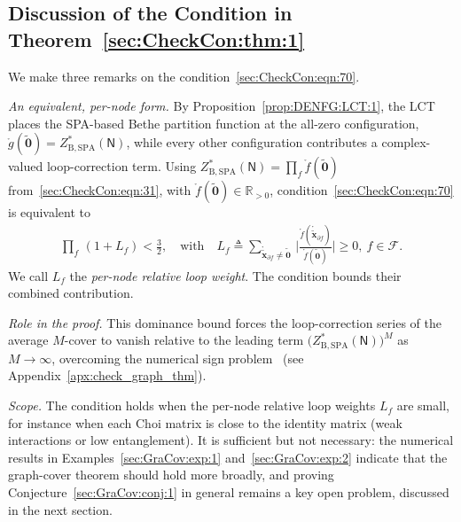 \documentclass[journal]{IEEEtran}
\newcommand{\add}[1]{{\color{black}#1}}
\newcommand{\vect}[1]{ \bm{#1} }
\newcommand{\set}[1]{\mathcal{#1}}
\newcommand{\setpf}{ \partial f }
\newcommand{\sR}{\mathbb{R}}
\newcommand{\graphN}{ \mathsf{N} }
\newcommand{\defeq}{ \triangleq }
\newcommand{\ZBSPA}{ Z_{\mathrm{B,SPA}} }
\newcommand{\LCTtv}[1]{ \mathring{ \tilde{ \vect{#1} } } }
\newcommand{\LCT}[1]{ \mathring{#1} }
\newcommand{\tv}[1]{ \tilde{\vect{#1}} }
\begin{document}
\subsection{Discussion of the Condition in \texorpdfstring{Theorem~\ref{sec:CheckCon:thm:1}}{Theorem 46}}

\add{We make three remarks on the condition~\eqref{sec:CheckCon:eqn:70}.

  \emph{An equivalent, per-node form.} By Proposition~\ref{prop:DENFG:LCT:1},
  the LCT places the SPA-based Bethe partition function at the all-zero
  configuration, $\LCT{g}(\tv{0}) = \ZBSPA^{*}(\graphN)$, while every other
  configuration contributes a complex-valued loop-correction term. Using
  $\ZBSPA^{*}(\graphN) = \prod_{f} \LCT{f}(\tv{0})$
  from~\eqref{sec:CheckCon:eqn:31}, with $\LCT{f}(\tv{0}) \in \sR_{>0}$,
  condition~\eqref{sec:CheckCon:eqn:70} is equivalent to
  \begin{align*}
    \prod_{f} \, ( 1 + L_f ) < \frac{3}{2}, \quad \text{with} \quad
    L_f
    \defeq
    \sum_{\LCTtv{x}_{\setpf} \neq \tv{0}} \,
    \Biggl|
    \frac{\LCT{f}(\LCTtv{x}_{\setpf})}
    {\LCT{f}(\tv{0})}
    \Biggr|
    \ge 0,
    \ f \in \set{F}.
  \end{align*}
  We call $L_f$ the \emph{per-node relative loop weight}. The condition
  bounds their combined contribution.

  \emph{Role in the proof.} This dominance bound forces the loop-correction series of the average $M$-cover to vanish relative to the leading term $\bigl( \ZBSPA^{*}(\graphN) \bigr)^{M}$ as $M \to \infty$, overcoming the numerical sign problem~\cite{LohJr1990} (see Appendix~\ref{apx:check_graph_thm}).

  \emph{Scope.} The condition holds when the per-node relative loop weights
  $L_f$ are small, for instance when each Choi matrix is close to the
  identity matrix (weak interactions or low entanglement). It is sufficient
  but not necessary: the numerical results in Examples~\ref{sec:GraCov:exp:1}
  and~\ref{sec:GraCov:exp:2} indicate that the graph-cover theorem should hold
  more broadly, and proving Conjecture~\ref{sec:GraCov:conj:1} in general
  remains a key open problem, discussed in the next section.}
\end{document}
